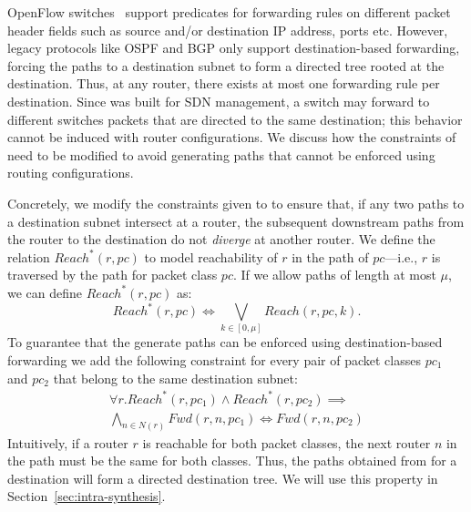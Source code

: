 OpenFlow switches~\cite{openflow} support predicates for
forwarding rules on different packet header fields such as source
and/or destination IP address, ports etc. However, legacy protocols
like OSPF and BGP only support destination-based forwarding, 
forcing the paths to a destination subnet to 
form a directed tree rooted at the destination. 
Thus,
at any router, there exists at most one forwarding rule per destination. 
Since \genesis was built for
SDN management,  a switch may forward to different switches
packets that are directed to the same destination;
this behavior cannot be induced with router
configurations. We  discuss how the
constraints of \genesis
need to be modified to avoid generating paths that 
cannot be enforced using routing configurations.

Concretely, we modify the constraints given to \genesis to ensure that,
if any two paths to a destination subnet intersect at a router,
the subsequent downstream paths from the router to the destination 
 do not \emph{diverge} at another router.  
We define the relation $Reach^*(r,pc)$ to model reachability 
of $r$ in the path of $pc$---i.e., $r$ is traversed by the path for packet class $pc$. 
If we allow paths of length at most $\mu$, we can define $Reach^*(r,pc)$ as:
\begin{equation}
	Reach^*(r,pc) \Leftrightarrow \bigvee_{k \in [0, \mu]} Reach(r, pc, k).
\end{equation}
To guarantee that the generate paths can be enforced using destination-based
forwarding we add
the following constraint for every pair of packet classes $pc_1$ and $pc_2$ that belong to the same 
 destination subnet:
 \begin{multline}
 \forall r. Reach^*(r, pc_1) \wedge Reach^*(r, pc_2) 
 \implies \\ \bigwedge_{n \in N(r)} Fwd(r, n, pc_1) \Leftrightarrow Fwd(r, n, pc_2)
 \end{multline}
Intuitively, 
 if a router $r$ is reachable for both packet classes, 
the next router $n$ in the path must be the same for both classes. Thus, the paths obtained
 from \genesis for a destination will form a 
 directed destination tree.
 We will use this property in Section~\ref{sec:intra-synthesis}. 

